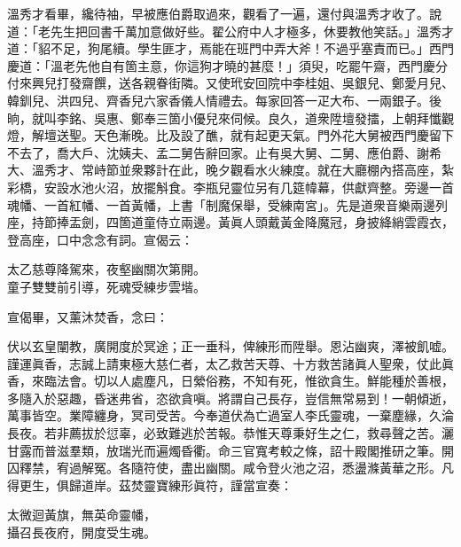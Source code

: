 溫秀才看畢，纔待袖，早被應伯爵取過來，觀看了一遍，還付與溫秀才收了。說道：「老先生把回書千萬加意做好些。翟公府中人才極多，休要教他笑話。」溫秀才道：「貂不足，狗尾續。學生匪才，焉能在班門中弄大斧！不過乎塞責而已。」西門慶道：「溫老先他自有箇主意，你這狗才曉的甚麼！」須臾，吃罷午齋，西門慶分付來興兒打發齋饌，送各親眷街隣。又使玳安回院中李桂姐、吳銀兒、鄭愛月兒、韓釧兒、洪四兒、齊香兒六家香儀人情禮去。每家回答一疋大布、一兩銀子。後晌，就叫李銘、吳惠、鄭奉三箇小優兒來伺候。良久，道衆陞壇發擂，上朝拜懺觀燈，解壇送聖。天色漸晚。比及設了醮，就有起更天氣。門外花大舅被西門慶留下不去了，喬大戶、沈姨夫、孟二舅告辭回家。止有吳大舅、二舅、應伯爵、謝希大、溫秀才、常峙節並衆夥計在此，晚夕觀看水火練度。就在大廳棚內搭高座，紮彩橋，安設水池火沼，放擺斛食。李瓶兒靈位另有几筵幃幕，供獻齊整。旁邊一首魂幡、一首紅幡、一首黃幡，上書「制魔保舉，受練南宮」。先是道衆音樂兩邊列座，持節捧盂劍，四箇道童侍立兩邊。黃眞人頭戴黃金降魔冠，身披絳綃雲霞衣，登高座，口中念念有詞。宣偈云：

\begin{myquote} 
太乙慈尊降駕來，夜壑幽關次第開。\\童子雙雙前引導，死魂受練步雲堦。
\end{myquote} 

宣偈畢，又薰沐焚香，念曰：

\begin{myquote}[\markfont]
伏以玄皇闡教，廣開度於冥途；正一垂科，俾練形而陞舉。恩沾幽爽，澤被飢嘘。謹運眞香，志誠上請東極大慈仁者，太乙救苦天尊、十方救苦諸眞人聖衆，仗此眞香，來臨法會。切以人處塵凡，日縈俗務，不知有死，惟欲貪生。鮮能種於善根，多隨入於惡趣，昏迷弗省，恣欲貪嗔。將謂自己長存，豈信無常易到！一朝傾逝，萬事皆空。業障纏身，冥司受苦。今奉道伏為亡過室人李氏靈魂，一棄塵緣，久淪長夜。若非薦拔於愆辜，必致難逃於苦報。恭惟天尊秉好生之仁，救尋聲之苦。灑甘露而普滋羣類，放瑞光而遍燭昏衢。命三官寬考較之條，詔十殿閣推研之筆。開囚釋禁，宥過解冤。各隨符使，盡出幽關。咸令登火池之沼，悉盪滌黃華之形。凡得更生，俱歸道岸。茲焚靈寶練形眞符，謹當宣奏：

太微迴黃旗，無英命靈幡，\\攝召長夜府，開度受生魂。

\end{myquote} 

